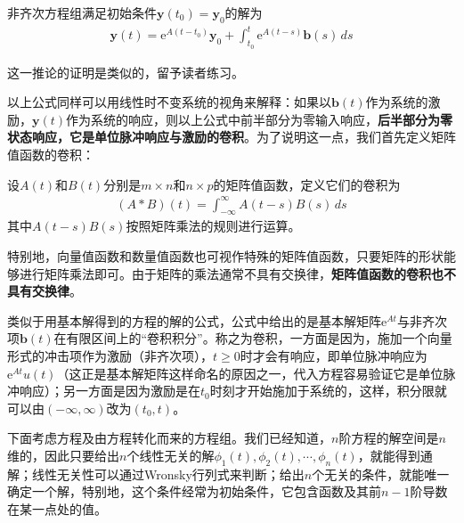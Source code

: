 \documentclass{ctexbook}
\begin{document}
\begin{corollary}
    非齐次方程组满足初始条件$\mathbf{y}(t_0)=\mathbf{y}_0$的解为\begin{align*}
    \mathbf{y}(t)=\mathrm{e}^{A(t-t_0)}\mathbf{y}_0+\int_{t_0}^t \mathrm{e}^{A(t-s)}\mathbf{b}(s)\,ds
    \end{align*}
\end{corollary}

这一推论的证明是类似的，留予读者练习。

以上公式同样可以用线性时不变系统的视角来解释：如果以$\mathbf{b}(t)$作为系统的激励，$\mathbf{y}(t)$作为系统的响应，则以上公式中前半部分为零输入响应，\textbf{后半部分为零状态响应，它是单位脉冲响应与激励的卷积}。为了说明这一点，我们首先定义矩阵值函数的卷积：

\begin{definition}[矩阵值函数的卷积]
    设$A(t)$和$B(t)$分别是$m\times n$和$n\times p$的矩阵值函数，定义它们的卷积为\begin{align*}
    (A*B)(t)=\int_{-\infty}^{\infty} A(t-s)B(s)\,ds
    \end{align*}
    其中$A(t-s)B(s)$按照矩阵乘法的规则进行运算。
\end{definition}

特别地，向量值函数和数量值函数也可视作特殊的矩阵值函数，只要矩阵的形状能够进行矩阵乘法即可。由于矩阵的乘法通常不具有交换律，\textbf{矩阵值函数的卷积也不具有交换律}。

类似于用基本解得到的方程的解的公式，公式中给出的是基本解矩阵$\mathrm{e}^{At}$与非齐次项$\mathbf{b}(t)$在有限区间上的“卷积积分”。称之为卷积，一方面是因为，施加一个向量形式的冲击项作为激励（非齐次项），$t\geq 0$时才会有响应，即单位脉冲响应为$\mathrm{e}^{At}u(t)$（这正是基本解矩阵这样命名的原因之一，代入方程容易验证它是单位脉冲响应）；另一方面是因为激励是在$t_0$时刻才开始施加于系统的，这样，积分限就可以由$(-\infty,\infty)$改为$(t_0,t)$。

下面考虑方程及由方程转化而来的方程组。我们已经知道，$n$阶方程的解空间是$n$维的，因此只要给出$n$个线性无关的解$\phi_1(t),\phi_2(t),\cdots,\phi_n(t)$，就能得到通解；线性无关性可以通过Wronsky行列式来判断；给出$n$个无关的条件，就能唯一确定一个解，特别地，这个条件经常为初始条件，它包含函数及其前$n-1$阶导数在某一点处的值。
\end{document}
